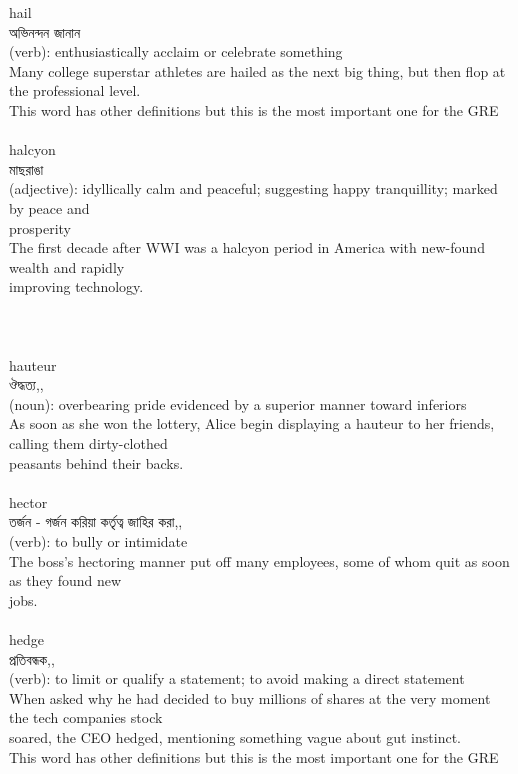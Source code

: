 \documentclass{article}
\begin{document}
{{hail}\\
{অভিনন্দন জানান}\\
{(verb): enthusiastically acclaim or celebrate something\\Many college superstar athletes are hailed as the next big thing, but then flop at the professional level.\\This word has other definitions but this is the most important one for the GRE\\}\\
{halcyon}\\
{মাছরাঙা}\\
{(adjective): idyllically calm and peaceful; suggesting happy tranquillity; marked by peace and\\prosperity\\The first decade after WWI was a halcyon period in America with new-found wealth and rapidly\\improving technology.\\\\                                                                                \\}\\
{hauteur}\\
{ঔদ্ধত্য,,}\\
{(noun): overbearing pride evidenced by a superior manner toward inferiors\\As soon as she won the lottery, Alice begin displaying a hauteur to her friends, calling them dirty-clothed\\peasants behind their backs.\\}\\
{hector}\\
{তর্জন - গর্জন করিয়া কর্তৃত্ব জাহির করা,,}\\
{(verb): to bully or intimidate\\The boss's hectoring manner put off many employees, some of whom quit as soon as they found new\\jobs.\\}\\
{hedge}\\
{প্রতিবন্ধক,,}\\
{(verb): to limit or qualify a statement; to avoid making a direct statement\\When asked why he had decided to buy millions of shares at the very moment the tech companies stock\\soared, the CEO hedged, mentioning something vague about gut instinct.\\This word has other definitions but this is the most important one for the GRE\\}\\
}
\end{document}
